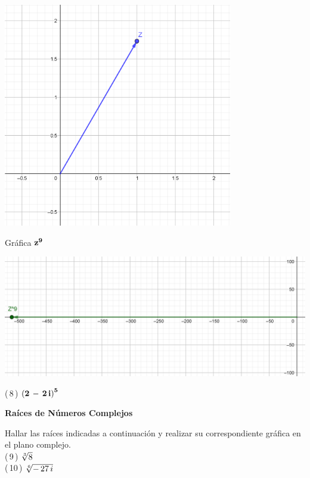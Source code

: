 \documentclass[a4paper,11pt,openany]{book}
\begin{document}
\begin{center}
    \includegraphics[width=10cm]{Gra-Ej-7-1.png}
\end{center}

\textcolor{ao(english)}{} Gráfica $\bf{z^{9}}$

\begin{center}
    \includegraphics[width=15cm]{Gra-Ej-7-2.png}
\end{center}

\textcolor{ao(english)}{(\,8\,)} $\bf{\left(2\,-\,2\,i\right)^{5}}$

\begin{center}
\textbf{Raíces de Números Complejos}
\end{center}

Hallar las raíces indicadas a continuación y realizar su correspondiente gráfica en el plano complejo.\\

\textcolor{ao(english)}{(\,9\,)} $\bf{\sqrt[3]{8}}$\\

\textcolor{ao(english)}{(\,10\,)} $\bf{\sqrt[6]{-\,27\,i}}$\\
\end{document}
